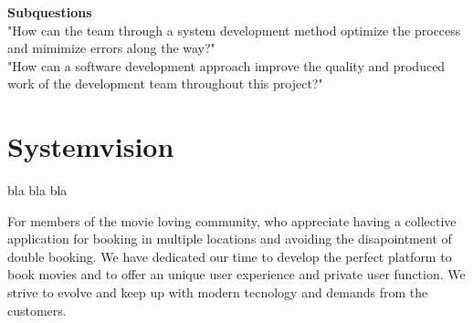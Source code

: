 \textbf{Subquestions} \\
"How can the team through a system development method optimize the proccess and mimimize errors along the way?" \\

"How can a software development approach improve the quality and produced work of the development team throughout this project?"\\

\section{Systemvision}
bla bla bla

For members of the movie loving community, who appreciate having a collective application for booking 
in multiple locations and avoiding the disapointment of double booking. We have dedicated our 
time to develop the perfect platform to book movies and to offer an unique user experience and private user function. 
We strive to evolve and keep up with modern tecnology and demands from the customers. \\
















